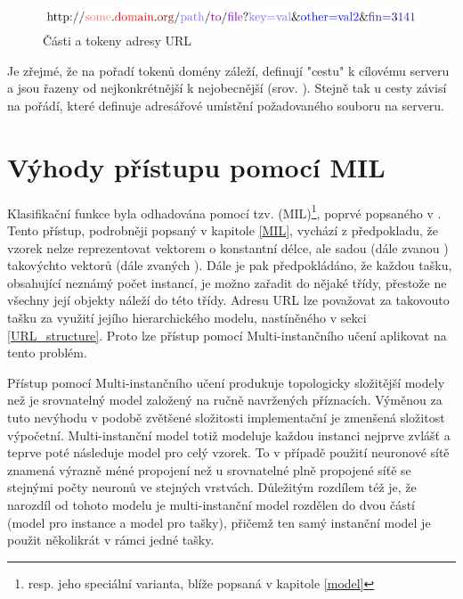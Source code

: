 \begin{figure}[h]
	\centering
	\includegraphics{images/url_subparts/url_subparts.pdf}
	\caption{Části a tokeny adresy URL}\label{url_subparts}
\end{figure}

Je zřejmé, že na pořadí tokenů domény záleží, definují "cestu" k cílovému serveru a jsou řazeny od nejkonkrétnější k nejobecnější (srov. \cite{mockapetris_domain_1987}). Stejně tak u cesty závisí na pořádí, které definuje adresářové umístění požadovaného souboru na serveru.

\section{Výhody přístupu pomocí MIL}

Klasifikační funkce byla odhadována pomocí tzv.  (MIL)\footnote{resp. jeho speciální varianta, blíže popsaná v kapitole \ref{model}}, poprvé popsaného v \cite{dietterich_solving_1997}. Tento přístup, podrobněji popsaný v kapitole \ref{MIL}, vychází z předpokladu, že vzorek nelze reprezentovat vektorem o konstantní délce, ale sadou (dále zvanou ) takovýchto vektorů (dále zvaných ). Dále je pak předpokládáno, že každou tašku, obsahující neznámý počet instancí, je možno zařadit do nějaké třídy, přestože ne všechny její objekty náleží do této třídy. Adresu URL lze považovat za takovouto tašku za využití jejího hierarchického modelu, nastíněného v sekci \ref{URL_structure}. Proto lze přístup pomocí Multi-instančního učení aplikovat na tento problém.

Přístup pomocí Multi-instančního učení produkuje topologicky složitější modely než je srovnatelný model založený na ručně navržených příznacích. Výměnou za tuto nevýhodu v podobě zvětšené složitosti implementační je zmenšená složitost výpočetní. Multi-instanční model totiž modeluje každou instanci nejprve zvlášť a teprve poté následuje model pro celý vzorek. To v případě použití neuronové sítě znamená výrazně méné propojení než u srovnatelné plně propojené síťě se stejnými počty neuronů ve stejných vrstvách. Důležitým rozdílem též je, že narozdíl od tohoto modelu je multi-instanční model rozdělen do dvou částí (model pro instance a model pro tašky), přičemž ten samý instanční model je použit několikrát v rámci jedné tašky.

